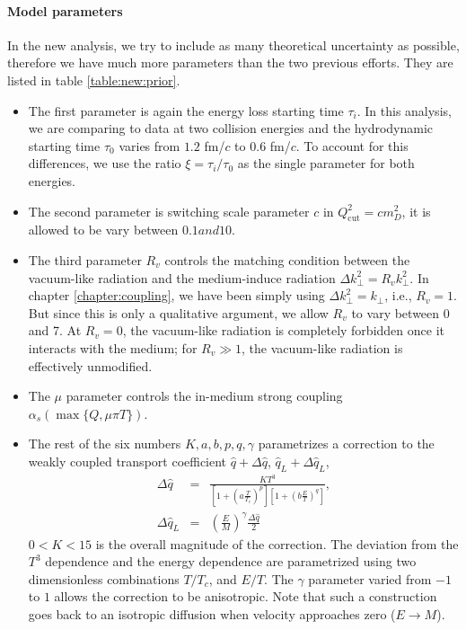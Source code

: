 \paragraph{Model parameters}
In the new analysis, we try to include as many theoretical uncertainty as possible, therefore we have much more parameters than the two previous efforts.
They are listed in table \ref{table:new:prior}.
\begin{itemize}
\item The first parameter is again the energy loss starting time $\tau_i$.
In this analysis, we are comparing to data at two collision energies and the hydrodynamic starting time $\tau_0$ varies from $1.2$ fm/$c$ to $0.6$ fm/$c$.
To account for this differences, we use the ratio $\xi = \tau_i/\tau_0$ as the single parameter for both energies.
\item The second parameter is switching scale parameter $c$ in $Q_{\textrm{cut}}^2 = c m_D^2$, it is allowed to be vary between $0.1 and 10$.
\item The third parameter $R_v$ controls the matching condition between the vacuum-like radiation and the medium-induce radiation $\Delta k_\perp^2 = R_v k_\perp^2$.
In chapter \ref{chapter:coupling}, we have been simply using $\Delta k_\perp^2 = k_\perp$, i.e., $R_v = 1$.
But since this is only a qualitative argument, we allow $R_v$ to vary between 0 and 7. 
At $R_v = 0$, the vacuum-like radiation is completely forbidden once it interacts with the medium; for $R_v \gg 1$, the vacuum-like radiation is effectively unmodified.
\item The $\mu$ parameter controls the in-medium strong coupling $\alpha_s(\max\{Q, \mu\pi T\})$.
\item The rest of the six numbers $K,a,b,p,q, \gamma$ parametrizes a correction to the weakly coupled transport coefficient $\hat{q} + \Delta\hat{q}$, $\hat{q}_L + \Delta\hat{q}_L$,
\begin{eqnarray}
\Delta\hat{q} &=& \frac{K T^3}{\left[1+\left(a\frac{T}{T_c}\right)^p\right]\left[1+\left(b\frac{E}{T}\right)^q\right]}, \\
\Delta\hat{q}_L &=& \left(\frac{E}{M}\right)^\gamma \frac{\Delta\hat{q}}{2}
\end{eqnarray}
$0 < K < 15$ is the overall magnitude of the correction. 
The deviation from the $T^3$ dependence and the energy dependence are parametrized using two dimensionless combinations $T/T_c$, and $E/T$.
The $\gamma$ parameter varied from $-1$ to $1$ allows the correction to be anisotropic.
Note that such a construction goes back to an isotropic diffusion when velocity approaches zero ($E\rightarrow M$).
\end{itemize}
